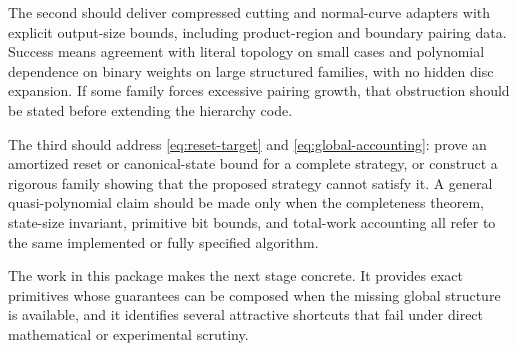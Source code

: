 The second should deliver compressed cutting and normal-curve adapters with
explicit output-size bounds, including product-region and boundary pairing
data. Success means agreement with literal topology on small cases and
polynomial dependence on binary weights on large structured families, with
no hidden disc expansion. If some family forces excessive pairing growth,
that obstruction should be stated before extending the hierarchy code.

The third should address \eqref{eq:reset-target} and
\eqref{eq:global-accounting}: prove an amortized reset or canonical-state
bound for a complete strategy, or construct a rigorous family showing that
the proposed strategy cannot satisfy it. A general quasi-polynomial claim
should be made only when the completeness theorem, state-size invariant,
primitive bit bounds, and total-work accounting all refer to the same
implemented or fully specified algorithm.

The work in this package makes the next stage concrete. It provides exact
primitives whose guarantees can be composed when the missing global
structure is available, and it identifies several attractive shortcuts
that fail under direct mathematical or experimental scrutiny.

